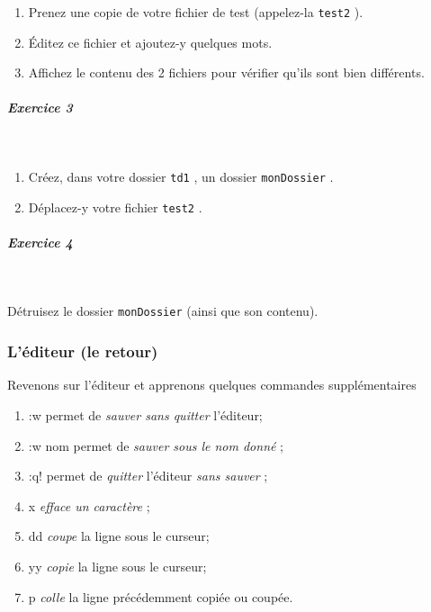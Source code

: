 \documentclass[11pt,a4paper]{article}
\begin{document}
					\begin{enumerate}
				
			\item 
	Prenez une copie de votre fichier de test (appelez-la  \texttt{test2} ). 
			\item \'Editez ce fichier et ajoutez-y quelques mots. 
			\item Affichez le contenu des 2 fichiers pour v\'erifier qu'ils sont bien diff\'erents.
	
					\end{enumerate}
				
			
		\subparagraph{Exercice 3} 
		
					\textcolor{white}{.} \par
				
            \par
        
					\begin{enumerate}
				
			\item 
	Cr\'eez, dans votre dossier  \texttt{td1} , un dossier  \texttt{monDossier} . 
			\item D\'eplacez-y votre fichier  \texttt{test2} .
					\end{enumerate}
				
			
		\subparagraph{Exercice 4} 
		
					\textcolor{white}{.} \par
				
            \par
        
D\'etruisez le dossier  \texttt{monDossier}  (ainsi que son contenu).

			
		\subsubsection{L'\'editeur (le retour)} 
		\label{TD1TD1learningObject9.tex}
			
Revenons sur l'\'editeur et apprenons quelques commandes suppl\'ementaires

					\begin{enumerate}
				
			\item :w  permet de  \textit{sauver sans quitter}  l'\'editeur; 
			\item :w nom  permet de  \textit{sauver sous le nom donn\'e} ;
			\item :q!  permet de  \textit{quitter}  l'\'editeur  \textit{sans sauver} ;
			\item x  \textit{efface un caract\`ere} ;
			\item dd  \textit{coupe}  la ligne sous le curseur;
			\item yy  \textit{copie}  la ligne sous le curseur;
			\item p  \textit{colle}  la ligne pr\'ec\'edemment copi\'ee ou coup\'ee.
					\end{enumerate}
				
\end{document}
